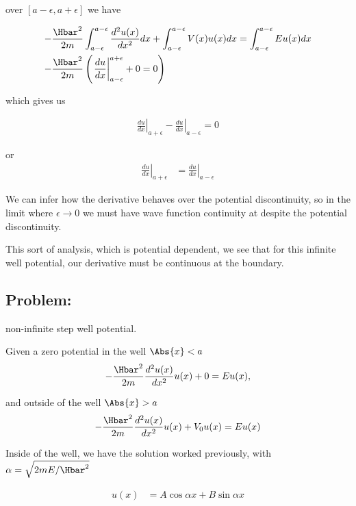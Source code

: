 over $[a-\epsilon,a+\epsilon]$ we have

\begin{align}\label{eqn:PHY356Lecture9:21}
-\frac{\Hbar^2 }{2m} &
\int_{a-\epsilon}^{a-\epsilon}
\frac{d^2 u(x)}{dx^2} dx
+
\int_{a-\epsilon}^{a-\epsilon}
V(x) u(x) dx =
\int_{a-\epsilon}^{a-\epsilon}
E u(x) dx \\
-\frac{\Hbar^2 }{2m} &
\left(
\left.\frac{du}{dx}\right\vert_{a-\epsilon}^{a+\epsilon} + 0 = 0
\right)
\end{align}

which gives us

\begin{align}\label{eqn:PHY356Lecture9:22}
\left.\frac{du}{dx}\right\vert_{a + \epsilon}
-\left.\frac{du}{dx}\right\vert_{a - \epsilon} = 0
\end{align}

or
\begin{align}\label{eqn:PHY356Lecture9:23}
\left.\frac{du}{dx}\right\vert_{a + \epsilon}
&=
\left.\frac{du}{dx}\right\vert_{a - \epsilon}
\end{align}

We can infer how the derivative behaves over the potential discontinuity, so in the limit where $\epsilon \rightarrow 0$ we must have wave function continuity at despite the potential discontinuity.

This sort of analysis, which is potential dependent, we see that for this infinite well potential, our derivative must be continuous at the boundary.

\subsection{Problem:}  non-infinite step well potential.

Given a zero potential in the well $\Abs{x} < a$
\begin{align}\label{eqn:PHY356Lecture9:30}
-\frac{\Hbar^2 }{2m} \frac{d^2 u(x)}{dx^2} u(x) + 0 = E u(x),
\end{align}

and outside of the well $\Abs{x} > a$
\begin{align}\label{eqn:PHY356Lecture9:31}
-\frac{\Hbar^2 }{2m} \frac{d^2 u(x)}{dx^2} u(x) + V_0 u(x) = E u(x)
\end{align}

Inside of the well, we have the solution worked previously, with $\alpha = \sqrt{2m E/\Hbar^2}$

\begin{align}\label{eqn:PHY356Lecture9:32}
u(x) &= A \cos\alpha x + B \sin\alpha x
\end{align}

